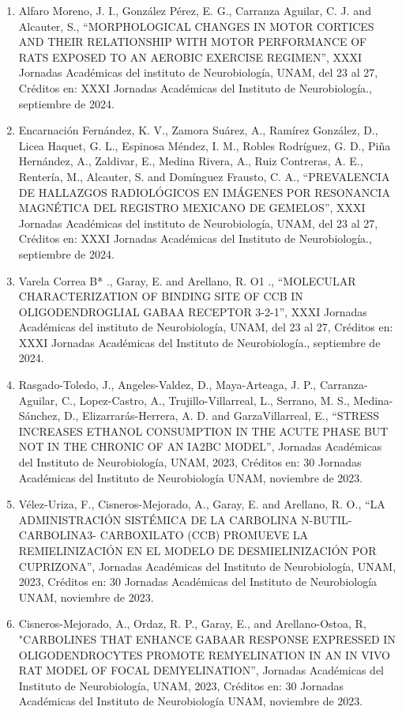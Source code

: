 \begin{enumerate}
\item Alfaro Moreno, J. I., González Pérez, E. G., Carranza Aguilar, C. J. and Alcauter, S., “MORPHOLOGICAL CHANGES IN MOTOR 
CORTICES AND THEIR RELATIONSHIP WITH MOTOR PERFORMANCE OF RATS EXPOSED TO AN AEROBIC EXERCISE REGIMEN”, XXXI Jornadas 
Académicas del instituto de Neurobiología, UNAM, del 23 al 27, Créditos en: XXXI Jornadas Académicas del Instituto de 
Neurobiología., septiembre de 2024.

\item Encarnación Fernández, K. V., Zamora Suárez, A., Ramírez González, D., Licea Haquet, G. L., Espinosa Méndez, I. M., 
Robles Rodríguez, G. D., Piña Hernández, A., Zaldivar, E., Medina Rivera, A., Ruiz Contreras, A. E., Rentería, M., 
Alcauter, S. and Domínguez Frausto, C. A., “PREVALENCIA DE HALLAZGOS RADIOLÓGICOS EN IMÁGENES POR RESONANCIA MAGNÉTICA DEL 
REGISTRO MEXICANO DE GEMELOS”, XXXI Jornadas Académicas del instituto de Neurobiología, UNAM, del 23 al 27, Créditos en: 
XXXI Jornadas Académicas del Instituto de Neurobiología., septiembre de 2024.

\item Varela Correa B* ., Garay, E. and Arellano, R. O1 ., “MOLECULAR CHARACTERIZATION OF BINDING SITE OF CCB IN 
OLIGODENDROGLIAL GABAA RECEPTOR 3-2-1”, XXXI Jornadas Académicas del instituto de Neurobiología, UNAM, del 23 al 27, 
Créditos en: XXXI Jornadas Académicas del Instituto de Neurobiología., septiembre de 2024.

\item Rasgado-Toledo, J., Angeles-Valdez, D., Maya-Arteaga, J. P., Carranza-Aguilar, C., Lopez-Castro, A., 
Trujillo-Villarreal, L., Serrano, M. S., Medina-Sánchez, D., Elizarrarás-Herrera, A. D. and GarzaVillarreal, E., “STRESS 
INCREASES ETHANOL CONSUMPTION IN THE ACUTE PHASE BUT NOT IN THE CHRONIC OF AN IA2BC MODEL”, Jornadas Académicas del 
Instituto de Neurobiología, UNAM, 2023, Créditos en: 30 Jornadas Académicas del Instituto de Neurobiología UNAM, noviembre 
de 2023.

\item Vélez-Uriza, F., Cisneros-Mejorado, A., Garay, E. and Arellano, R. O., “LA ADMINISTRACIÓN SISTÉMICA DE LA CARBOLINA 
N-BUTIL-CARBOLINA3- CARBOXILATO (CCB) PROMUEVE LA REMIELINIZACIÓN EN EL MODELO DE DESMIELINIZACIÓN POR CUPRIZONA”, 
Jornadas Académicas del Instituto de Neurobiología, UNAM, 2023, Créditos en: 30 Jornadas Académicas del Instituto de 
Neurobiología UNAM, noviembre de 2023.

\item Cisneros-Mejorado, A., Ordaz, R. P., Garay, E., and Arellano-Ostoa, R, "CARBOLINES THAT ENHANCE GABAAR RESPONSE 
EXPRESSED IN OLIGODENDROCYTES PROMOTE REMYELINATION IN AN IN VIVO RAT MODEL OF FOCAL DEMYELINATION”, Jornadas Académicas 
del Instituto de Neurobiología, UNAM, 2023, Créditos en: 30 Jornadas Académicas del Instituto de Neurobiología UNAM, 
noviembre de 2023.


\end{enumerate}
